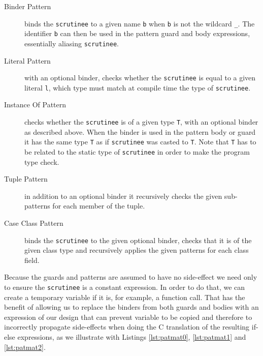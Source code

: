 \documentclass[a4paper,twoside]{article}
\newcommand{\InlineS}[1]{\lstinline[language=Leon]|#1|}
\begin{document}
\begin{description}

\item[Binder Pattern]

binds the \InlineS{scrutinee} to a given name \InlineS{b} when \InlineS{b} is
not the wildcard \InlineS{_}. The identifier \InlineS{b} can then be used in the
pattern guard and body expressions, essentially aliasing \InlineS{scrutinee}.


\item[Literal Pattern]

with an optional binder, checks whether the \InlineS{scrutinee} is equal to a
given literal \InlineS{l}, which type must match at compile time the type of
\InlineS{scrutinee}.


\item[Instance Of Pattern]

checks whether the \InlineS{scrutinee} is of a given type \InlineS{T}, with an
optional binder as described above. When the binder is used in the pattern body
or guard it has the same type \InlineS{T} as if \InlineS{scrutinee} was casted
to \InlineS{T}.  Note that \InlineS{T} has to be related to the static type of
\InlineS{scrutinee} in order to make the program type check.


\item[Tuple Pattern]

in addition to an optional binder it recursively checks the given sub-patterns
for each member of the tuple.


\item[Case Class Pattern]

binds the \InlineS{scrutinee} to the given optional binder, checks that it is of
the given class type and recursively applies the given patterns for each class
field.

\end{description}

Because the guards and patterns are assumed to have no side-effect we need only
to ensure the \InlineS{scrutinee} is a constant expression. In order to do that,
we can create a temporary variable if it is, for example, a function call. That
has the benefit of allowing us to replace the binders from both guards and
bodies with an expression of our design that can prevent variable to be copied
and therefore to incorrectly propagate side-effects when doing the C translation
of the resulting if-else expressions, as we illustrate with Listings
\ref{lst:patmat0}, \ref{lst:patmat1} and \ref{lst:patmat2}.
\end{document}
